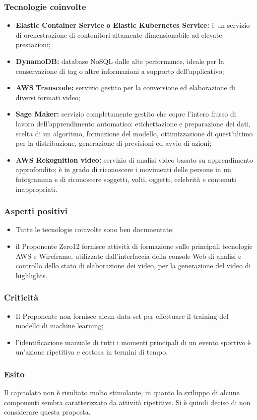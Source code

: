 \subsubsection{Tecnologie coinvolte}
	\begin{itemize}
		\item \textbf{Elastic Container Service} \textbf{o Elastic Kubernetes Service:} è un servizio di orchestrazione di contenitori altamente dimensionabile ad elevate
		prestazioni; 
		\item \textbf{DynamoDB:} database NoSQL dalle alte performance, ideale per la conservazione di tag o altre informazioni a supporto dell'applicativo; 
		\item \textbf{AWS} \textbf{Transcode:} servizio gestito per la conversione ed elaborazione di diversi formati video; 
		\item \textbf{Sage Maker}\textbf{:} servizio completamente gestito che copre l'intero flusso di lavoro dell'apprendimento automatico: etichettazione e preparazione dei
		dati, scelta di un algoritmo, formazione del modello, ottimizzazione di quest'ultimo per la distribuzione, generazione di previsioni ed avvio di azioni; 
		\item \textbf{AWS} \textbf{Rekognition video:} servizio di analisi video basato su apprendimento approfondito; è in grado di riconoscere i movimenti delle persone
		in un fotogramma e di riconoscere soggetti, volti, oggetti, celebrità e contenuti inappropriati. 
	\end{itemize}

\subsubsection{Aspetti positivi}
	\begin{itemize}
		\item Tutte le tecnologie coinvolte sono ben documentate; 
		\item il Proponente Zero12 fornisce attività di formazione sulle principali tecnologie AWS e Wireframe, utilizzate dall’interfaccia della console Web di analisi e controllo dello stato di elaborazione dei video, per la generazione del video di highlights.
	\end{itemize}

\subsubsection{Criticità}
	\begin{itemize}
		\item Il Proponente non fornisce alcun data-set per effettuare il training del modello di machine learning; 
		\item l'identificazione manuale di tutti i momenti principali di un evento sportivo è un'azione ripetitiva e costosa in termini di tempo. 
	\end{itemize}

\subsubsection{Esito}
Il capitolato non è risultato molto stimolante, in quanto lo sviluppo di alcune componenti sembra caratterizzato da attività ripetitive. Si è quindi deciso di non considerare questa proposta. 
